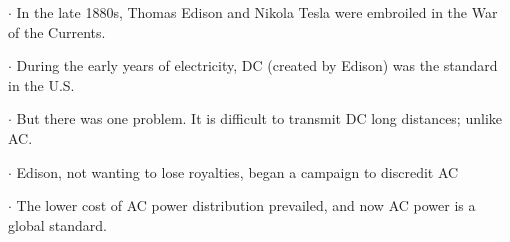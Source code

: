 \documentclass[preview]{standalone}
\begin{document}
\centering \begin{flushleft} $\cdot$ In the late 1880s, Thomas Edison and Nikola Tesla were embroiled in the War of the Currents.\end{flushleft} \begin{flushleft} $\cdot$ During the early years of electricity, DC (created by Edison) was the standard in the U.S.\end{flushleft} \begin{flushleft} $\cdot$ But there was one problem. It is difficult to transmit DC long distances; unlike AC.\end{flushleft} \begin{flushleft} $\cdot$ Edison, not wanting to lose royalties, began a campaign to discredit AC\end{flushleft} \begin{flushleft} $\cdot$ The lower cost of AC power distribution prevailed, and now AC power is a global standard.\end{flushleft}
\end{document}
